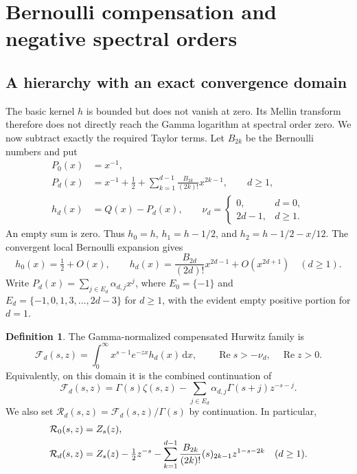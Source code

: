 \documentclass[11pt,a4paper]{article}
\theoremstyle{definition}
\newtheorem{definition}[theorem]{Definition}
\numberwithin{equation}{section}
\newcommand{\Rea}{\operatorname{Re}}
\newcommand{\dd}{\,\mathrm d}
\begin{document}
\section{Bernoulli compensation and negative spectral orders}
\label{sec:compensation}

\subsection{A hierarchy with an exact convergence domain}
The basic kernel $h$ is bounded but does not vanish at zero. Its Mellin
transform therefore does not directly reach the Gamma logarithm at spectral
order zero. We now subtract exactly the required Taylor terms.
Let $B_{2k}$ be the Bernoulli numbers and put
\begin{align}
 P_0(x)&=x^{-1},\label{eq:P0}\\
 P_d(x)&=x^{-1}+\frac12+
       \sum_{k=1}^{d-1}\frac{B_{2k}}{(2k)!}x^{2k-1},\qquad d\ge1,
                 \label{eq:Pd}\\
 h_d(x)&=Q(x)-P_d(x),\qquad
 \nu_d=\begin{cases}0,&d=0,\\2d-1,&d\ge1.\end{cases}
                 \label{eq:hd}
\end{align}
An empty sum is zero. Thus $h_0=h$, $h_1=h-1/2$, and
$h_2=h-1/2-x/12$. The convergent local Bernoulli expansion gives
\begin{equation}\label{eq:hd-valuation}
 h_0(x)=\tfrac12+O(x),\qquad
 h_d(x)=\frac{B_{2d}}{(2d)!}x^{2d-1}+O(x^{2d+1})\quad(d\ge1).
\end{equation}
Write $P_d(x)=\sum_{j\in E_d}\alpha_{d,j}x^j$, where
$E_0=\{-1\}$ and
$E_d=\{-1,0,1,3,\ldots,2d-3\}$ for $d\ge1$, with the evident empty
positive portion for $d=1$.

\begin{definition}\label{def:Fd}
The Gamma-normalized compensated Hurwitz family is
\begin{equation}\label{eq:Fd-laplace}
 \mathcal F_d(s,z)=\int_0^\infty x^{s-1}e^{-zx}h_d(x)\dd x,
 \qquad\Rea s>-\nu_d,\quad\Rea z>0.
\end{equation}
Equivalently, on this domain it is the combined continuation of
\begin{equation}\label{eq:Fd-closed}
 \mathcal F_d(s,z)=\Gamma(s)\zeta(s,z)
       -\sum_{j\in E_d}\alpha_{d,j}\Gamma(s+j)z^{-s-j}.
\end{equation}
We also set $\mathcal R_d(s,z)=\mathcal F_d(s,z)/\Gamma(s)$ by
continuation. In particular,
\begin{align}
 \mathcal R_0(s,z)&=Z_s(z),\notag\\
 \mathcal R_d(s,z)&=Z_s(z)-\tfrac12z^{-s}
  -\sum_{k=1}^{d-1}\frac{B_{2k}}{(2k)!}(s)_{2k-1}z^{1-s-2k}
          \quad(d\ge1).\label{eq:Rd}
\end{align}
\end{definition}
\end{document}
